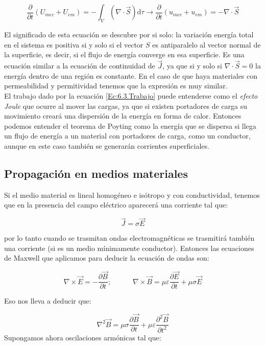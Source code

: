\documentclass[12pt,a4paper]{article}
\newcommand{\parciales}[2]{\frac{\partial #1}{\partial #2}}
\newcommand{\D}{\mathrm{d}}
\newcommand{\tquad}{\quad \quad \quad}
\begin{document}
\begin{equation}
\parciales{}{t} (U_{mec} + U_{em}) = - \int_V  (\nabla \cdot \vec{S}) \D \tau \longrightarrow \parciales{}{t} (u_{mec} + u_{em}) = - \nabla \cdot \vec{S}
\end{equation}

El significado de esta ecuación se descubre por si solo: la variación energía total en el sistema es positiva si y solo si el vector $S$ es antiparalelo al vector normal de la superficie, es decir, si el flujo de energía converge en esa superficie. Es una ecuación similar a la ecuación de continuidad de $\vec{J}$, ya que si y solo si $\nabla \cdot \vec{S}  = 0$ la energía dentro de una región es constante. En el caso de que haya materiales con permeabilidad y permitividad tenemos que la expresión es muy similar. \\

El trabajo dado por la ecuación \ref{Ec:6.3.Trabajo} puede entenderse como el \textit{efecto Joule} que ocurre al mover las cargas, ya que si existen portadores de carga su movimiento creará una dispersión de la energía en forma de calor. Entonces podemos entender el teorema de Poyting como la energía que se dispersa si llega un flujo de energía a un material con portadores de carga, como un conductor, aunque en este caso también se generarán corrientes superficiales. 

 

\subsection{Propagación en medios materiales}
 
Si el medio material es lineal homogéneo e isótropo y con conductividad, tenemos que en la presencia del campo eléctrico aparecerá una corriente tal que:

$$ \vec{J} = \sigma \vec{E} $$
 
por lo tanto cuando se trasmitan ondas electromagnéticas se trasmitirá también una corriente (si es un medio mínimamente conductor). Entonces las ecuaciones de Maxwell que aplicamos para deducir la ecuación de ondas son:

$$ \nabla \times \vec{E} = - \parciales{\vec{B}}{t}; \tquad \nabla \times \vec{B}  = \mu \varepsilon \parciales{\vec{E}}{t} + \mu \sigma \vec{E} $$

Eso nos lleva a deducir que:

\begin{equation}
\nabla^2 \vec{B} = \mu \sigma \parciales{\vec{B}}{t}  + \mu \varepsilon \parciales{^2 \vec{B}}{t^2}
\end{equation}
Supongamos ahora oscilaciones armónicas tal que:
\end{document}
